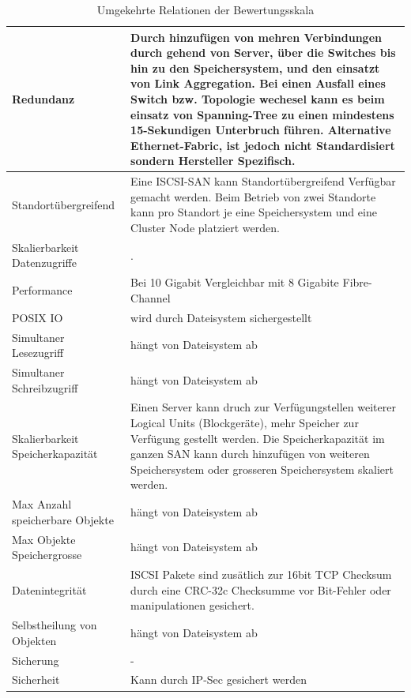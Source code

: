 \begin{table}[htbp]
\caption{Umgekehrte Relationen der Bewertungsskala}
\begin{tabular}{|L{3.5cm}|L{10cm}|}
\hline
Redundanz & Durch hinzufügen von mehren Verbindungen durch gehend von Server, über die Switches bis hin zu den Speichersystem, und den einsatzt von Link Aggregation. Bei einen Ausfall eines Switch bzw. Topologie wechesel kann es beim einsatz von Spanning-Tree zu einen mindestens 15-Sekundigen Unterbruch führen. Alternative Ethernet-Fabric, ist jedoch nicht Standardisiert sondern Hersteller Spezifisch. \\ \hline
Standortübergreifend & Eine ISCSI-SAN kann Standortübergreifend Verfügbar gemacht werden. Beim Betrieb von zwei Standorte kann pro Standort je eine Speichersystem und eine Cluster Node platziert werden. \\ \hline
Skalierbarkeit Datenzugriffe & . \\ \hline
Performance & Bei 10 Gigabit Vergleichbar mit 8 Gigabite Fibre-Channel \\ \hline
POSIX IO & wird durch Dateisystem sichergestellt \\ \hline
Simultaner Lesezugriff & hängt von Dateisystem ab \\ \hline
Simultaner Schreibzugriff & hängt von Dateisystem ab \\ \hline
Skalierbarkeit Speicherkapazität & Einen Server kann druch zur Verfügungstellen weiterer Logical Units (Blockgeräte), mehr Speicher zur Verfügung gestellt werden. Die Speicherkapazität im ganzen SAN kann durch hinzufügen von weiteren Speichersystem oder grosseren Speichersystem skaliert werden. \\ \hline
Max Anzahl speicherbare Objekte & hängt von Dateisystem ab \\ \hline
Max Objekte Speichergrosse & hängt von Dateisystem ab \\ \hline
Datenintegrität & ISCSI Pakete sind zusätlich zur 16bit TCP Checksum durch eine CRC-32c Checksumme vor Bit-Fehler oder manipulationen gesichert. \\ \hline
Selbstheilung von Objekten & hängt von Dateisystem ab \\ \hline
Sicherung & - \\ \hline
Sicherheit & Kann durch IP-Sec gesichert werden \\ \hline
\end{tabular}
\label{UmgekehrteBewertungsskala}
\end{table}



